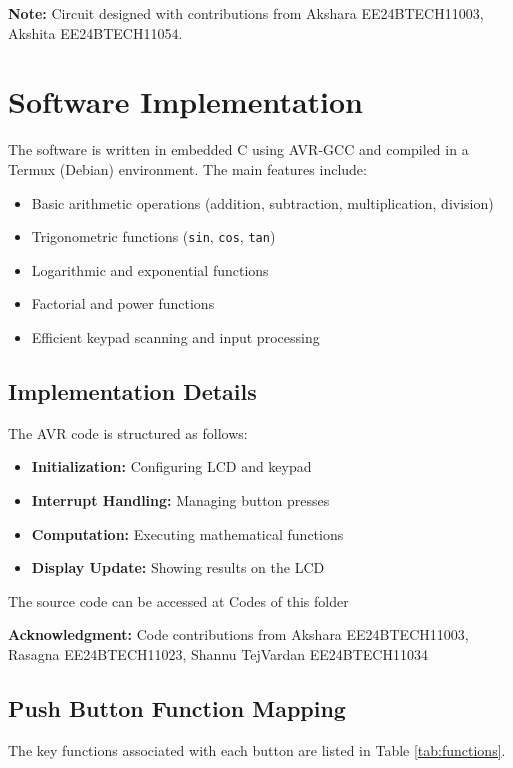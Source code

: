 \documentclass[12pt,a4paper]{article}
\begin{document}


\textbf{Note:} Circuit designed with contributions from Akshara EE24BTECH11003, Akshita EE24BTECH11054.

\section{Software Implementation}
The software is written in embedded C using AVR-GCC and compiled in a Termux (Debian) environment. The main features include:
\begin{itemize}
    \item Basic arithmetic operations (addition, subtraction, multiplication, division)
    \item Trigonometric functions (\texttt{sin}, \texttt{cos}, \texttt{tan})
    \item Logarithmic and exponential functions
    \item Factorial and power functions
    \item Efficient keypad scanning and input processing
\end{itemize}

\subsection{Implementation Details}
The AVR code is structured as follows:
\begin{itemize}
    \item \textbf{Initialization:} Configuring LCD and keypad
    \item \textbf{Interrupt Handling:} Managing button presses
    \item \textbf{Computation:} Executing mathematical functions
    \item \textbf{Display Update:} Showing results on the LCD
\end{itemize}

The source code can be accessed at Codes of this folder

\textbf{Acknowledgment:} Code contributions from Akshara EE24BTECH11003, Rasagna EE24BTECH11023, Shannu TejVardan EE24BTECH11034

\subsection{Push Button Function Mapping}
The key functions associated with each button are listed in Table \ref{tab:functions}.


\end{document}
